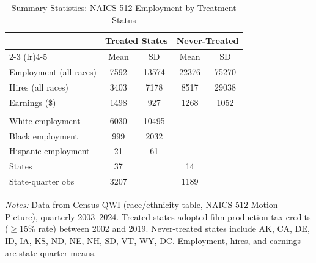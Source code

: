 \begin{table}[H]
\centering
\caption{Summary Statistics: NAICS 512 Employment by Treatment Status}
\label{tab:summary}
\begin{threeparttable}
\begin{tabular}{lcccc}
\toprule
 & \multicolumn{2}{c}{Treated States} & \multicolumn{2}{c}{Never-Treated} \\
\cmidrule(lr){2-3} \cmidrule(lr){4-5}
 & Mean & SD & Mean & SD \\
\midrule
Employment (all races) & 7592 & 13574 & 22376 & 75270 \\
Hires (all races) & 3403 & 7178 & 8517 & 29038 \\
Earnings (\$) & 1498 & 927 & 1268 & 1052 \\
\addlinespace
\multicolumn{5}{l}{\textit{Treated states, by race:}} \\
\quad White employment & 6030 & 10495 & & \\
\quad Black employment & 999 & 2032 & & \\
\quad Hispanic employment & 21 & 61 & & \\
\addlinespace
States & 37 & & 14 & \\
State-quarter obs & 3207 & & 1189 & \\
\bottomrule
\end{tabular}
\begin{tablenotes}[flushleft]\small
\item \textit{Notes:} Data from Census QWI (race/ethnicity table, NAICS 512 Motion Picture), quarterly 2003--2024. Treated states adopted film production tax credits ($\geq$15\% rate) between 2002 and 2019. Never-treated states include AK, CA, DE, ID, IA, KS, ND, NE, NH, SD, VT, WY, DC. Employment, hires, and earnings are state-quarter means.
\end{tablenotes}
\end{threeparttable}
\end{table}

